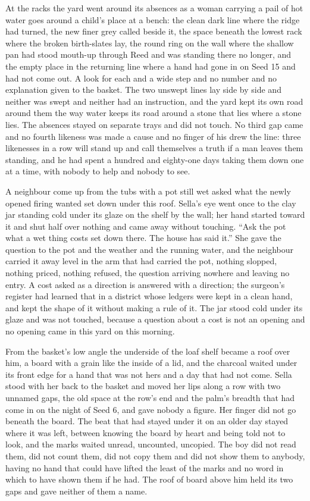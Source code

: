 At the racks the yard went around its absences as a woman carrying a pail of hot water goes around a child's place at a bench: the clean dark line where the ridge had turned, the new finer grey called  beside it, the space beneath the lowest rack where the broken birth-slates lay, the round ring on the wall where the shallow pan had stood mouth-up through Reed and was standing there no longer, and the empty place in the returning line where a hand had gone in on Seed 15 and had not come out. A look for each and a wide step and no number and no explanation given to the basket. The two unswept lines lay side by side and neither was swept and neither had an instruction, and the yard kept its own road around them the way water keeps its road around a stone that lies where a stone lies. The absences stayed on separate trays and did not touch. No third gap came and no fourth likeness was made a cause and no finger of his drew the line: three likenesses in a row will stand up and call themselves a truth if a man leaves them standing, and he had spent a hundred and eighty-one days taking them down one at a time, with nobody to help and nobody to see.

A neighbour come up from the tubs with a pot still wet asked what the newly opened firing wanted set down under this roof. Sella's eye went once to the clay jar standing cold under its glaze on the shelf by the wall; her hand started toward it and shut half over nothing and came away without touching. “Ask the pot what a wet thing costs set down there. The house has said it.” She gave the question to the pot and the weather and the running water, and the neighbour carried it away level in the arm that had carried the pot, nothing slopped, nothing priced, nothing refused, the question arriving nowhere and leaving no entry. A cost asked as a direction is answered with a direction; the surgeon's register had learned that in a district whose ledgers were kept in a clean hand, and kept the shape of it without making a rule of it. The jar stood cold under its glaze and was not touched, because a question about a cost is not an opening and no opening came in this yard on this morning.

From the basket's low angle the underside of the loaf shelf became a roof over him, a board with a grain like the inside of a lid, and the charcoal waited under its front edge for a hand that was not hers and a day that had not come. Sella stood with her back to the basket and moved her lips along a row with two unnamed gaps, the old space at the row's end and the palm's breadth that had come in on the night of Seed 6, and gave nobody a figure. Her finger did not go beneath the board. The beat that had stayed under it on an older day stayed where it was left, between knowing the board by heart and being told not to look, and the marks waited unread, uncounted, uncopied. The boy did not read them, did not count them, did not copy them and did not show them to anybody, having no hand that could have lifted the least of the marks and no word in which to have shown them if he had. The roof of board above him held its two gaps and gave neither of them a name.

